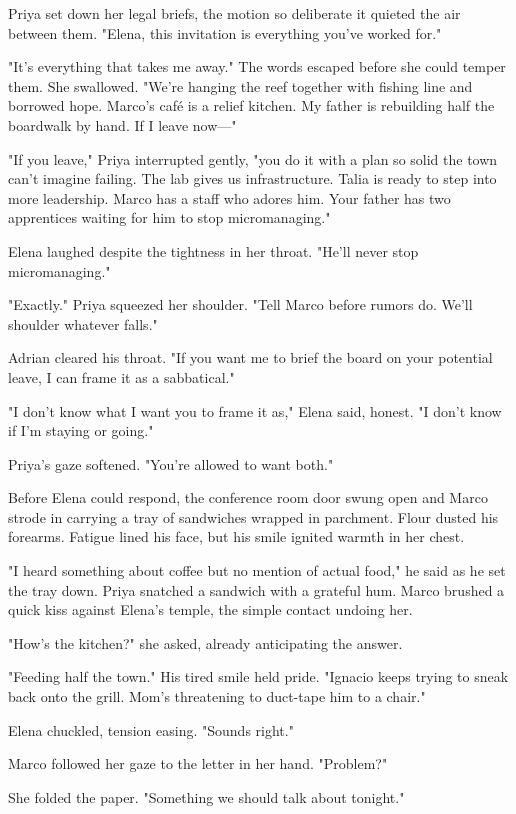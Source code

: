 Priya set down her legal briefs, the motion so deliberate it quieted the air between them. "Elena, this invitation is everything you've worked for."

"It's everything that takes me away." The words escaped before she could temper them. She swallowed. "We're hanging the reef together with fishing line and borrowed hope. Marco's café is a relief kitchen. My father is rebuilding half the boardwalk by hand. If I leave now—"

"If you leave," Priya interrupted gently, "you do it with a plan so solid the town can't imagine failing. The lab gives us infrastructure. Talia is ready to step into more leadership. Marco has a staff who adores him. Your father has two apprentices waiting for him to stop micromanaging."

Elena laughed despite the tightness in her throat. "He'll never stop micromanaging."

"Exactly." Priya squeezed her shoulder. "Tell Marco before rumors do. We'll shoulder whatever falls."

Adrian cleared his throat. "If you want me to brief the board on your potential leave, I can frame it as a sabbatical."

"I don't know what I want you to frame it as," Elena said, honest. "I don't know if I'm staying or going."

Priya's gaze softened. "You're allowed to want both."

Before Elena could respond, the conference room door swung open and Marco strode in carrying a tray of sandwiches wrapped in parchment. Flour dusted his forearms. Fatigue lined his face, but his smile ignited warmth in her chest.

"I heard something about coffee but no mention of actual food," he said as he set the tray down. Priya snatched a sandwich with a grateful hum. Marco brushed a quick kiss against Elena's temple, the simple contact undoing her.

"How's the kitchen?" she asked, already anticipating the answer.

"Feeding half the town." His tired smile held pride. "Ignacio keeps trying to sneak back onto the grill. Mom's threatening to duct-tape him to a chair."

Elena chuckled, tension easing. "Sounds right."

Marco followed her gaze to the letter in her hand. "Problem?"

She folded the paper. "Something we should talk about tonight."

